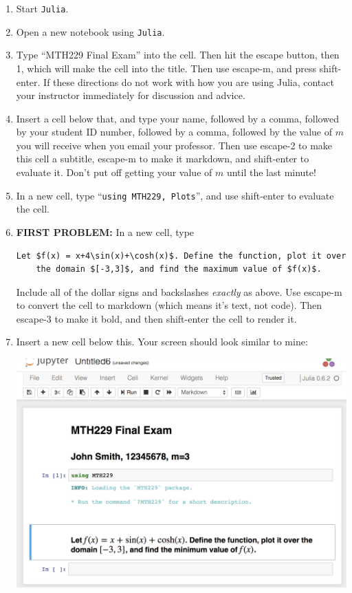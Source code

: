 \documentclass[12pt,answers]{book}
\newcommand{\julia}{{\tt Julia}}
\begin{document}
\begin{enumerate}%
  \item Start \julia.
  \item Open a new notebook using \julia.
  \item Type ``MTH229 Final Exam'' into the cell. Then hit the escape button, then 1, which will make the cell into the title. Then use escape-m, and press shift-enter. If these directions do not work with how you are using Julia, contact your instructor immediately for discussion and advice.
  \item Insert a cell below that, and type your name, followed by a comma, followed by your
  student ID number, followed by a comma, followed by the value of $m$ you will receive when you email your professor. Then use escape-2 to make this cell a subtitle, escape-m to make it markdown, and shift-enter to evaluate it. Don't put off getting your value of $m$ until the last minute!
  \item In a new cell, type ``{\tt using MTH229, Plots}'', and use shift-enter to evaluate the cell.
  \clearpage
  \item {\bf FIRST PROBLEM:} In a new cell, type
  \begin{lstlisting}[breaklines]
    Let $f(x) = x+4\sin(x)+\cosh(x)$. Define the function, plot it over
    the domain $[-3,3]$, and find the maximum value of $f(x)$.
  \end{lstlisting}
  Include all  of the dollar signs and backslashes \emph{exactly} as above. Use escape-m to convert the cell to markdown (which means it's text, not code). Then escape-3 to make it bold, and then shift-enter the cell to render it.
  \item Insert a new cell below this. Your screen should look similar to mine:

  \begin{center} \includegraphics[width=5in]{SkeletonNotes/extracredit-1.png} \end{center}


\end{enumerate}
\end{document}

